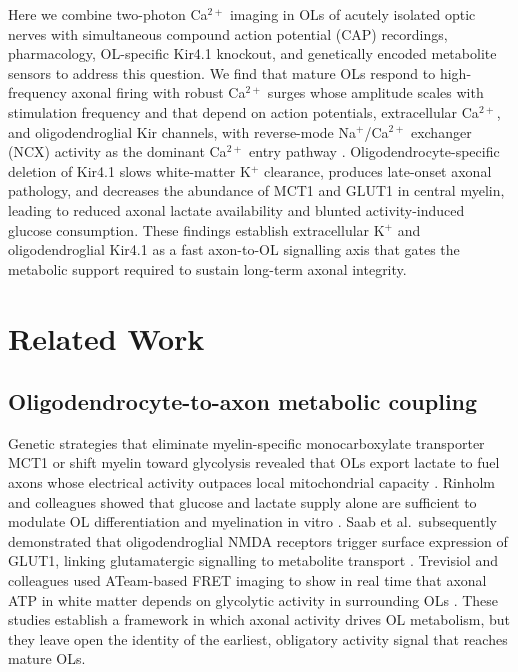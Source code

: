 Here we combine two-photon Ca$^{2+}$ imaging in OLs of acutely isolated optic nerves with simultaneous compound action potential (CAP) recordings, pharmacology, OL-specific Kir4.1 knockout, and genetically encoded metabolite sensors to address this question. We find that mature OLs respond to high-frequency axonal firing with robust Ca$^{2+}$ surges whose amplitude scales with stimulation frequency and that depend on action potentials, extracellular Ca$^{2+}$, and oligodendroglial Kir channels, with reverse-mode Na$^+$/Ca$^{2+}$ exchanger (NCX) activity as the dominant Ca$^{2+}$ entry pathway \citep{Stys1992,Tekkok2005,Micu2018}. Oligodendrocyte-specific deletion of Kir4.1 slows white-matter K$^+$ clearance, produces late-onset axonal pathology, and decreases the abundance of MCT1 and GLUT1 in central myelin, leading to reduced axonal lactate availability and blunted activity-induced glucose consumption. These findings establish extracellular K$^+$ and oligodendroglial Kir4.1 as a fast axon-to-OL signalling axis that gates the metabolic support required to sustain long-term axonal integrity.

\section{Related Work}

\subsection{Oligodendrocyte-to-axon metabolic coupling}

Genetic strategies that eliminate myelin-specific monocarboxylate transporter MCT1 or shift myelin toward glycolysis revealed that OLs export lactate to fuel axons whose electrical activity outpaces local mitochondrial capacity \citep{Funfschilling2012,Lee2012}. Rinholm and colleagues showed that glucose and lactate supply alone are sufficient to modulate OL differentiation and myelination in vitro \citep{Rinholm2011}. Saab et al.\ subsequently demonstrated that oligodendroglial NMDA receptors trigger surface expression of GLUT1, linking glutamatergic signalling to metabolite transport \citep{Saab2016}. Trevisiol and colleagues used ATeam-based FRET imaging to show in real time that axonal ATP in white matter depends on glycolytic activity in surrounding OLs \citep{Trevisiol2017}. These studies establish a framework in which axonal activity drives OL metabolism, but they leave open the identity of the earliest, obligatory activity signal that reaches mature OLs.

